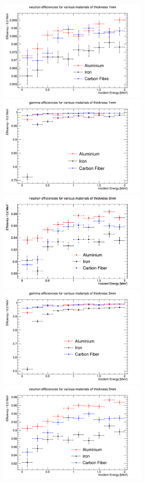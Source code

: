 \begin{figure}[htbp]
\begin{center}
\includegraphics[width=75mm]{Chapter6/figures/neutron1mmMaterialsEfficiency0-2MeV.png}
\includegraphics[width=75mm]{Chapter6/figures/gamma1mmMaterialsEfficiency0-2MeV.png}
\includegraphics[width=75mm]{Chapter6/figures/neutron3mmMaterialsEfficiency0-2MeV.png}
\includegraphics[width=75mm]{Chapter6/figures/gamma3mmMaterialsEfficiency0-2MeV.png}
\includegraphics[width=75mm]{Chapter6/figures/neutron5mmMaterialsEfficiency0-2MeV.png}

\end{center}
\end{figure}
